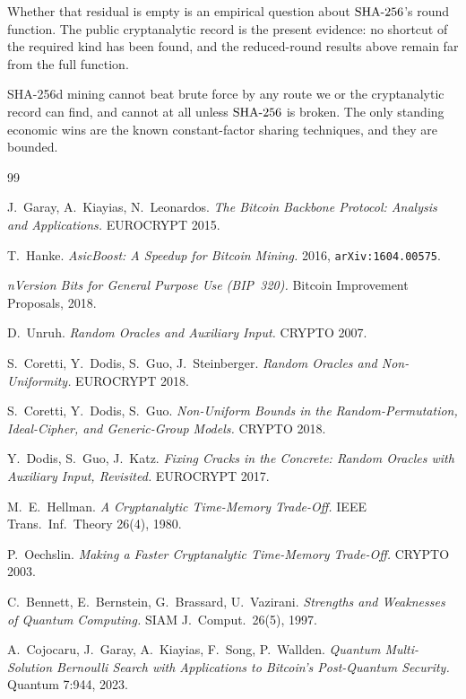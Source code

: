\documentclass[11pt]{article}
\begin{document}
Whether that residual is empty is an empirical question about $\mathrm{SHA\text{-}256}$'s
round function. The public cryptanalytic record is the present evidence:
no shortcut of the required kind has been found, and the reduced-round
results above remain far from the full function.

SHA-256d mining cannot beat brute force by any route we or the
cryptanalytic record can find, and cannot at all unless $\mathrm{SHA\text{-}256}$ is broken.
The only standing economic wins are the known constant-factor sharing
techniques, and they are bounded.

\begin{thebibliography}{99}

J.~Garay, A.~Kiayias, N.~Leonardos.
\emph{The Bitcoin Backbone Protocol: Analysis and Applications.}
EUROCRYPT 2015.

T.~Hanke.
\emph{AsicBoost: A Speedup for Bitcoin Mining.}
2016, \texttt{arXiv:1604.00575}.

\emph{nVersion Bits for General Purpose Use (BIP~320).}
Bitcoin Improvement Proposals, 2018.

D.~Unruh.
\emph{Random Oracles and Auxiliary Input.}
CRYPTO 2007.

S.~Coretti, Y.~Dodis, S.~Guo, J.~Steinberger.
\emph{Random Oracles and Non-Uniformity.}
EUROCRYPT 2018.

S.~Coretti, Y.~Dodis, S.~Guo.
\emph{Non-Uniform Bounds in the Random-Permutation, Ideal-Cipher, and
Generic-Group Models.}
CRYPTO 2018.

Y.~Dodis, S.~Guo, J.~Katz.
\emph{Fixing Cracks in the Concrete: Random Oracles with Auxiliary Input,
Revisited.}
EUROCRYPT 2017.

M.~E.~Hellman.
\emph{A Cryptanalytic Time-Memory Trade-Off.}
IEEE Trans.\ Inf.\ Theory 26(4), 1980.

P.~Oechslin.
\emph{Making a Faster Cryptanalytic Time-Memory Trade-Off.}
CRYPTO 2003.

C.~Bennett, E.~Bernstein, G.~Brassard, U.~Vazirani.
\emph{Strengths and Weaknesses of Quantum Computing.}
SIAM J.\ Comput.\ 26(5), 1997.

A.~Cojocaru, J.~Garay, A.~Kiayias, F.~Song, P.~Wallden.
\emph{Quantum Multi-Solution Bernoulli Search with Applications to
Bitcoin's Post-Quantum Security.}
Quantum 7:944, 2023.


\end{thebibliography}
\end{document}
